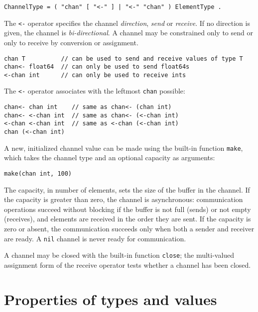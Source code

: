 {\begin{Verbatim}[frame=single]
ChannelType = ( "chan" [ "<-" ] | "<-" "chan" ) ElementType .
\end{Verbatim}

The \texttt{\textless{}-} operator specifies the channel
\emph{direction}, \emph{send} or \emph{receive}. If no direction is
given, the channel is \emph{bi-directional}. A channel may be
constrained only to send or only to receive by
conversion or
assignment.

\begin{Verbatim}[frame=single]
chan T          // can be used to send and receive values of type T
chan<- float64  // can only be used to send float64s
<-chan int      // can only be used to receive ints
\end{Verbatim}

The \texttt{\textless{}-} operator associates with the leftmost
\texttt{chan} possible:

\begin{Verbatim}[frame=single]
chan<- chan int    // same as chan<- (chan int)
chan<- <-chan int  // same as chan<- (<-chan int)
<-chan <-chan int  // same as <-chan (<-chan int)
chan (<-chan int)
\end{Verbatim}

A new, initialized channel value can be made using the built-in function
\texttt{make}, which
takes the channel type and an optional capacity as arguments:

\begin{Verbatim}[frame=single]
make(chan int, 100)
\end{Verbatim}

The capacity, in number of elements, sets the size of the buffer in the
channel. If the capacity is greater than zero, the channel is
asynchronous: communication operations succeed without blocking if the
buffer is not full (sends) or not empty (receives), and elements are
received in the order they are sent. If the capacity is zero or absent,
the communication succeeds only when both a sender and receiver are
ready. A \texttt{nil} channel is never ready for communication.

A channel may be closed with the built-in function
\texttt{close}; the multi-valued assignment form of
the receive operator tests whether a
channel has been closed.

\section*{Properties of types and values}

}

